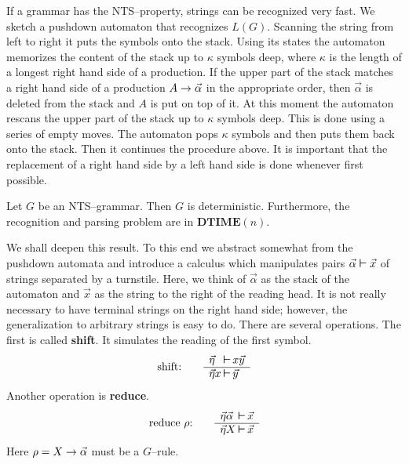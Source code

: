 If a grammar has the NTS--property, strings can be recognized
very fast. We sketch a pushdown automaton that recognizes
$L(G)$. Scanning the string from left to right it puts the
symbols onto the stack. Using its states the automaton
memorizes the content of the stack up to $\kappa$ symbols
deep, where $\kappa$ is the length of a longest right hand
side of a production. If the upper part of the stack matches
a right hand side of a production $A \rightarrow \vec{\alpha}$ in
the appropriate order, then $\vec{\alpha}$ is deleted from
the stack and $A$ is put on top of it. At this moment the
automaton rescans the upper part of the stack up to $\kappa$
symbols deep. This is done using a series of empty moves. The 
automaton pops $\kappa$ symbols and then puts them back onto 
the stack.  Then it continues the procedure above. It is 
important that the replacement of a right hand side by a left 
hand side is done whenever first possible.
\begin{thm}
Let $G$ be an NTS--grammar. Then $G$ is deterministic.
Furthermore, the recognition and parsing problem are in
$\textbf{DTIME}(n)$.
\end{thm}
We shall deepen this result. To this end we abstract somewhat
from the pushdown automata and introduce a calculus which
manipulates pairs $\vec{\alpha} \boldsymbol{\vdash} \vec{x}$ of strings
separated by a turnstile. Here, we think of $\vec{\alpha}$
as the stack of the automaton and $\vec{x}$ as the string
to the right of the reading head.  It is not really necessary
to have terminal strings on the right hand side; however,
the generalization to arbitrary strings is easy to do.
There are several operations. The first is called
\textbf{shift}. It simulates the reading of the first
symbol.
\begin{equation}
\mbox{\rm shift:}\qquad \begin{array}{l@{\,\bvdash\,}l}
\vec{\eta} & x \vec{y} \\\hline
\vec{\eta}x & \vec{y}
\end{array}
\end{equation}
Another operation is \textbf{reduce}.
\begin{equation}
\mbox{reduce $\rho$:}\qquad
    \begin{array}{l@{\,\bvdash\,}l}
\vec{\eta}\vec{\alpha} & \vec{x} \\\hline
\vec{\eta}X & \vec{x}
\end{array}
\end{equation}
Here $\rho = X \rightarrow \vec{\alpha}$ must be a $G$--rule.
